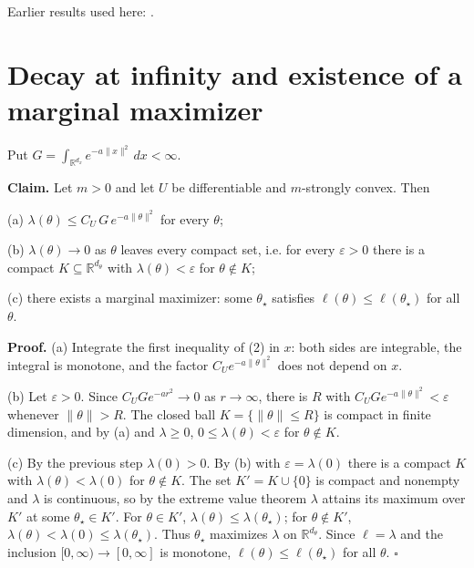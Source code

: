 \documentclass[11pt,a4paper]{article}
\begin{document}
Earlier results used here: \cite[Section~3.26.4]{LangevinLean2026ULASC}.

\section{\texorpdfstring{Decay at infinity and existence of a marginal maximizer}{Decay at infinity and existence of a marginal maximizer}}


Put \(G=\int_{\mathbb R^{d_x}}e^{-a\|x\|^2}\,dx<\infty\).




\textbf{Claim.} Let \(m>0\) and let \(U\) be differentiable and \(m\)-strongly convex. Then




(a) \(\lambda(\theta)\le C_U\,G\,e^{-a\|\theta\|^2}\) for every \(\theta\);




(b) \(\lambda(\theta)\to0\) as \(\theta\) leaves every compact set, i.e. for every \(\varepsilon>0\) there is a compact \(K\subseteq\mathbb R^{d_\theta}\) with \(\lambda(\theta)<\varepsilon\) for \(\theta\notin K\);




(c) there exists a marginal maximizer: some \(\theta_\star\) satisfies \(\ell(\theta)\le\ell(\theta_\star)\) for all \(\theta\).




\textbf{Proof.} (a) Integrate the first inequality of (2) in \(x\): both sides are integrable, the integral is monotone, and the factor \(C_Ue^{-a\|\theta\|^2}\) does not depend on \(x\).




(b) Let \(\varepsilon>0\). Since \(C_UGe^{-ar^2}\to0\) as \(r\to\infty\), there is \(R\) with \(C_UGe^{-a\|\theta\|^2}<\varepsilon\) whenever \(\|\theta\|>R\). The closed ball \(K=\{\|\theta\|\le R\}\) is compact in finite dimension, and by (a) and \(\lambda\ge0\), \(0\le\lambda(\theta)<\varepsilon\) for \(\theta\notin K\).




(c) By the previous step \(\lambda(0)>0\). By (b) with \(\varepsilon=\lambda(0)\) there is a compact \(K\) with \(\lambda(\theta)<\lambda(0)\) for \(\theta\notin K\). The set \(K'=K\cup\{0\}\) is compact and nonempty and \(\lambda\) is continuous, so by the extreme value theorem \(\lambda\) attains its maximum over \(K'\) at some \(\theta_\star\in K'\). For \(\theta\in K'\), \(\lambda(\theta)\le\lambda(\theta_\star)\); for \(\theta\notin K'\), \(\lambda(\theta)<\lambda(0)\le\lambda(\theta_\star)\). Thus \(\theta_\star\) maximizes \(\lambda\) on \(\mathbb R^{d_\theta}\). Since \(\ell=\lambda\) and the inclusion \([0,\infty)\to[0,\infty]\) is monotone, \(\ell(\theta)\le\ell(\theta_\star)\) for all \(\theta\). \(\square\)
\end{document}
